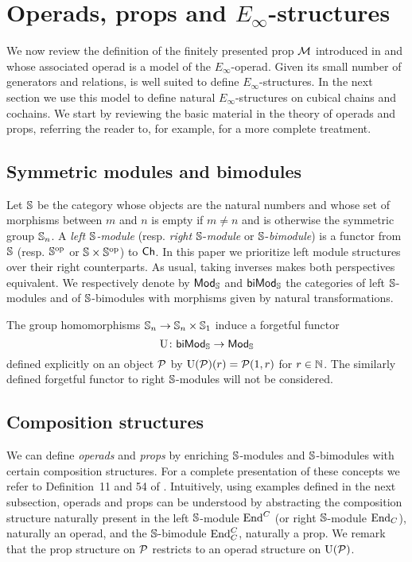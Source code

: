 
\section{Operads, props and \texorpdfstring{${E_\infty}$}{E-infty}-structures} \label{s:operads and props}

We now review the definition of the finitely presented prop $\mathcal{M}$ introduced in \cite{medina2020prop1} and whose associated operad is a model of the $E_\infty$-operad.
Given its small number of generators and relations, is well suited to define $E_\infty$-structures.
In the next section we use this model to define natural $E_\infty$-structures on cubical chains and cochains.
We start by reviewing the basic material in the theory of operads and props, referring the reader to, for example, \cite{markl2008props} for a more complete treatment.

\subsection{Symmetric modules and bimodules}

Let $\mathbb{S}$ be the category whose objects are the natural numbers and whose set of morphisms between $m$ and $n$ is empty if $m \neq n$ and is otherwise the symmetric group $\mathbb{S}_n$.
A \textit{left $\mathbb{S}$-module} (resp. \textit{right} $\mathbb{S}$-\textit{module} or $\mathbb{S}$-\textit{bimodule}) is a functor from $\mathbb{S}$ (resp. $\mathbb{S}^{\mathrm{op}}$ or $\mathbb{S} \times \mathbb{S}^{\mathrm{op}}$) to $\mathsf{Ch}$.
In this paper we prioritize left module structures over their right counterparts.
As usual, taking inverses makes both perspectives equivalent.
We respectively denote by $\mathsf{Mod}_{\mathbb{S}}$ and $\mathsf{biMod}_{\mathbb{S}}$ the categories of left $\mathbb{S}$-modules and of $\mathbb{S}$-bimodules with morphisms given by natural transformations.

The group homomorphisms $\mathbb{S}_n \to \mathbb{S}_n \times \mathbb{S}_1$ induce a forgetful functor \[
\operatorname{U} \colon \mathsf{biMod}_{\mathbb{S}} \to \mathsf{Mod}_{\mathbb{S}}
\]
defined explicitly on an object $\mathcal{P}$ by $\operatorname{U}(\mathcal{P})(r) = \mathcal{P}(1, r)$ for $r \in \mathbb{N}$.
The similarly defined forgetful functor to right $\mathbb{S}$-modules will not be considered.

\subsection{Composition structures}

We can define \textit{operads} and \textit{props} by enriching $\mathbb{S}$-modules and $\mathbb{S}$-bimodules with certain composition structures.
For a complete presentation of these concepts we refer to Definition~11 and 54 of \cite{markl2008props}.
Intuitively, using examples defined in the next subsection, operads and props can be understood by abstracting the composition structure naturally present in the left $\mathbb{S}$-module $\mathrm{End}^C$ (or right $\mathbb{S}$-module $\mathrm{End}_C$), naturally an operad, and the $\mathbb{S}$-bimodule $\mathrm{End}^C_C$, naturally a prop.
We remark that the prop structure on $\mathcal{P}$ restricts to an operad structure on $\operatorname{U}(\mathcal{P})$.

